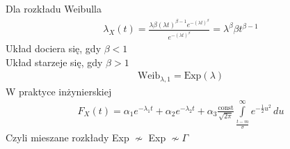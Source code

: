 Dla rozkładu Weibulla
\begin{gather*}
\lambda_X(t)=\frac{\lambda\beta(\lambda t)^{\beta-1}e^{-(\lambda t)^\beta}}{e^{-(\lambda t)^\beta}}=\lambda^\beta\beta t^{\beta-1}
\end{gather*}
Układ dociera się, gdy $ \beta<1 $\\
Układ starzeje się, gdy $ \beta>1 $\\
\begin{gather*}
\text{Weib}_{\lambda,1}=\text{Exp}(\lambda)
\end{gather*}
W praktyce inżynierskiej
\begin{gather*}
F_X(t)=\alpha_1e^{-\lambda_1 t}+\alpha_2 e^{-\lambda_2 t}+\alpha_3 \frac{\text{const}}{\sqrt{2\pi}}\int\limits_{\frac{t-m}{\sigma}}^{\infty }e^{-\tfrac{1}{2}u^2}\,du
\end{gather*}
Czyli mieszane rozkłady Exp $ \nsim $ Exp $\nsim \Gamma $

